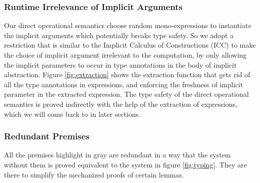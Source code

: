 \subsubsection{Runtime Irrelevance of Implicit Arguments}

Our direct operational semantics choose random mono-expressions to instantiate
the implicit arguments which potentially breaks type safety. So we adopt a
restriction that is similar to the Implicit Calculus of Constructions (ICC) \cite{miquel2001implicit}
to make the choice of implicit argument irrelevant to the computation, by only
allowing the implicit parameters to occur in type annotations in the body of
implicit abstraction. Figure \ref{fig:extraction} shows the extraction function
that gets rid of all the type annotations in expressions, and enforcing the
freshness of implicit parameter in the extracted expression. The type safety of
the direct operational semantics is proved indirectly with the help of
the extraction of expressions, which we will come back to in later sections.

\subsubsection{Redundant Premises}

All the premises highlight in gray are redundant in a way that
the system without them is proved equivalent to the system in figure \ref{fig:typing}.
They are there to simplify the mechanized proofs of certain lemmas.

